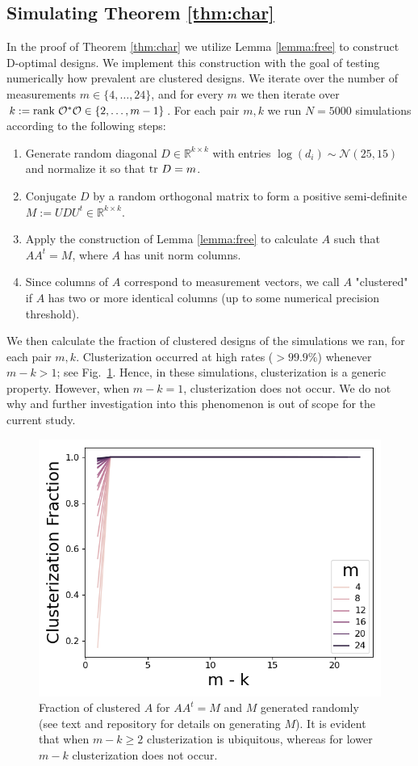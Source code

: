 \documentclass[ba]{imsart}
\newcommand{\obs}{\mathcal{O}}
\newcommand{\ttr}[1]{\textup{tr}\ #1}
\newcommand{\rank}{\textup{rank}\ }
\theoremstyle{plain}
\theoremstyle{definition}
\theoremstyle{remark}
\begin{document}
\subsection{Simulating Theorem \ref{thm:char}}\label{subsec:lemma_sims}
In the proof of Theorem \ref{thm:char} we utilize Lemma
\ref{lemma:free} to construct D-optimal designs. We implement this
construction with the goal of testing numerically how prevalent are
clustered designs. We iterate over the number of measurements $m \in
\{4,\dots, 24\}$, and for every $m$ we then iterate over $k:=\rank
\obs^*\obs \in \{2,\dots, m-1\}$. For each pair $m,k$ we run $N=5000$
simulations according to the following steps:
\begin{enumerate}
\item Generate random diagonal $D\in \mathbb{R}^{k\times k}$ with
  entries $\log (d_i) \sim \mathcal{N}(25,15)$ and normalize it so
  that $\ttr D = m$.
\item Conjugate $D$ by a random orthogonal matrix to form a positive
  semi-definite $M := UDU^t \in \mathbb{R}^{k\times k}$.
\item Apply the construction of Lemma \ref{lemma:free} to calculate
  $A$ such that $AA^t = M$, where $A$ has unit norm columns.
\item Since columns of $A$ correspond to measurement vectors, we call
  $A$ "clustered" if $A$ has two or more identical columns (up to some
  numerical precision threshold).
\end{enumerate}
We then calculate the fraction of clustered designs of the simulations
we ran, for each pair $m,k$. Clusterization occurred at high rates
($>99.9\%$) whenever $m-k > 1$; see Fig.~\ref{fig:sim_AAt}. Hence, in
these simulations, clusterization is a generic property. However, when
$m-k = 1$, clusterization does not occur. We do not why and further
investigation into this phenomenon is out of scope for the current
study.

\begin{figure}
    \centering
    \includegraphics[height=0.5\textwidth]{figs/simulations.png}
    \caption{Fraction of clustered $A$ for $AA^t = M$ and $M$
      generated randomly (see text and repository for details on
      generating $M$). It is evident that when $m-k \geq 2$ clusterization
      is ubiquitous, whereas for lower $m-k$ clusterization does not
      occur.}
  \label{fig:sim_AAt}
\end{figure}
\end{document}
